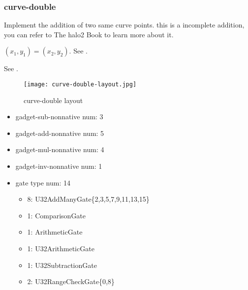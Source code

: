 \subsubsection{curve-double}

Implement the addition of two same curve points. this is a incomplete addition, you can refer to The halo2 Book \cite{website:halo2-book} to learn more about it.

$(x_1,y_1) = (x_2,y_2)$. See .

See .
\begin{figure}[!ht]
    \centering
    \texttt{[image: curve-double-layout.jpg]}
    \caption{curve-double layout}
    \label{fig:curve-double-layout}
\end{figure}

\begin{itemize}
    \item gadget-sub-nonnative num: 3
    \item gadget-add-nonnative num: 5
    \item gadget-mul-nonnative num: 4
    \item gadget-inv-nonnative num: 1
    \item gate type num: 14
        \begin{itemize}
            \item 8: U32AddManyGate\{2,3,5,7,9,11,13,15\}
            \item 1: ComparisonGate
            \item 1: ArithmeticGate
            \item 1: U32ArithmeticGate
            \item 1: U32SubtractionGate
            \item 2: U32RangeCheckGate\{0,8\}
        \end{itemize}
\end{itemize}
